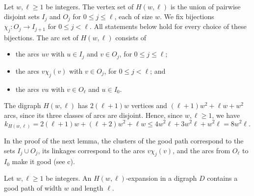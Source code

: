\documentclass[fontsize=12pt,leading=14pt]{fullpaper}
\newcommand{\Hwl}{H(w,\ell)}
\begin{document}
\begin{definition}[The digraph $\Hwl$]\label{def:Hwl}
  Let $w,\ell\ge1$ be integers.
  The vertex set of $\Hwl$ is the union of pairwise disjoint sets $I_j$ and $O_j$ for $0\le j\le\ell$, each of size $w$.
  We fix bijections $\chi_j\colon O_j\to I_{j+1}$ for $0\le j<\ell$.
  All statements below hold for every choice of these bijections.
  The arc set of $\Hwl$ consists of
  \begin{itemize}
    \item the arcs $uv$ with $u\in I_j$ and $v\in O_j$, for $0\le j\le\ell$;
    \item the arcs $v\chi_j(v)$ with $v\in O_j$, for $0\le j<\ell$; and
    \item the arcs $vu$ with $v\in O_\ell$ and $u\in I_0$.
  \end{itemize}
\end{definition}

The digraph $\Hwl$ has $2(\ell+1)w$ vertices and $(\ell+1)w^2+\ell w+w^2$ arcs, since its three classes of arcs are disjoint.
Hence, since $w,\ell\ge1$, we have
\begin{equation}\label{eq:Hwl-count}
  k_{\Hwl}=2(\ell+1)w+(\ell+2)w^2+\ell w\le4w^2\ell+3w^2\ell+w^2\ell=8w^2\ell.
\end{equation}

In the proof of the next lemma, the clusters of the good path correspond to the sets $I_j\cup O_j$, its linkages correspond to the arcs $v\chi_j(v)$, and the arcs from $O_\ell$ to $I_0$ make it good (see c).

\begin{lemma}\label{lem:read-path}
  Let $w,\ell\ge1$ be integers.
  An $\Hwl$-expansion in a digraph $D$ contains a good path of width $w$ and length $\ell$.
\end{lemma}
\end{document}
